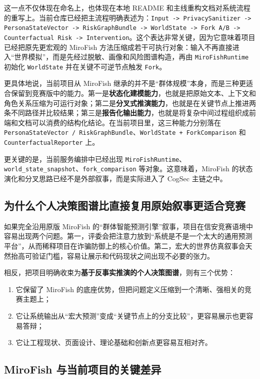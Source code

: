 \documentclass[12pt,a4paper]{ctexart}
\newcommand{\CorePosition}{\textbf{基于反事实推演的个人决策图谱}}
\begin{document}
这一点不仅体现在命名上，也体现在本地 README 和主线重构文档对系统流程的重写上。当前仓库已经把主流程明确表述为：\texttt{Input -> PrivacySanitizer -> PersonaStateVector -> RiskGraphBundle -> WorldState -> Fork A/B -> Counterfactual Risk -> Intervention}。这个表达非常关键，因为它意味着项目已经把原先更宏观的 MiroFish 方法压缩成若干可执行对象：输入不再直接进入“世界模拟”，而是先经过脱敏、画像和风险图谱构造，再由 \texttt{MiroFishRuntime} 初始化 \texttt{WorldState} 并在关键不可逆节点触发 \texttt{Fork}。

更具体地说，当前项目从 MiroFish 继承的并不是“群体规模”本身，而是三种更适合保留到竞赛版中的能力。第一是\textbf{状态化建模能力}，也就是把原始文本、上下文和角色关系压缩为可运行对象；第二是\textbf{分叉式推演能力}，也就是在关键节点上推进两条不同路径并比较结果；第三是\textbf{报告化输出能力}，也就是将复杂中间过程组织成前端和文档可以消费的结构化结论。在当前项目里，这三种能力分别落在 \texttt{PersonaStateVector / RiskGraphBundle}、\texttt{WorldState + ForkComparison} 和 \texttt{CounterfactualReporter} 上。

更关键的是，当前服务编排中已经出现 \texttt{MiroFishRuntime}、\texttt{world\_state\_snapshot}、\texttt{fork\_comparison} 等对象。这意味着，MiroFish 的状态演化和分叉思路已经不是外部叙事，而是实际进入了 CogSec 主链之中。

\subsection{为什么个人决策图谱比直接复用原始叙事更适合竞赛}

如果完全沿用原版 MiroFish 的“群体智能预测引擎”叙事，项目在信安竞赛语境中容易出现两个问题。第一，评委会把注意力放到“系统是不是一个太大的通用预测平台”，从而稀释项目在诈骗防御上的核心价值。第二，宏大的世界仿真叙事会天然抬高可验证门槛，容易让展示和代码现状之间出现不必要的张力。

相反，把项目明确收束为\CorePosition{}，则有三个优势：
\begin{enumerate}[leftmargin=2em]
  \item 它保留了 MiroFish 的底座优势，但把问题定义压缩到一个清晰、强相关的竞赛主题上；
  \item 它让系统输出从“宏大预测”变成“关键节点上的分支比较”，更容易展示也更容易答辩；
  \item 它让工程现状、页面设计、理论基础和创新点更容易互相对齐。
\end{enumerate}

\subsection{MiroFish 与当前项目的关键差异}
\end{document}
